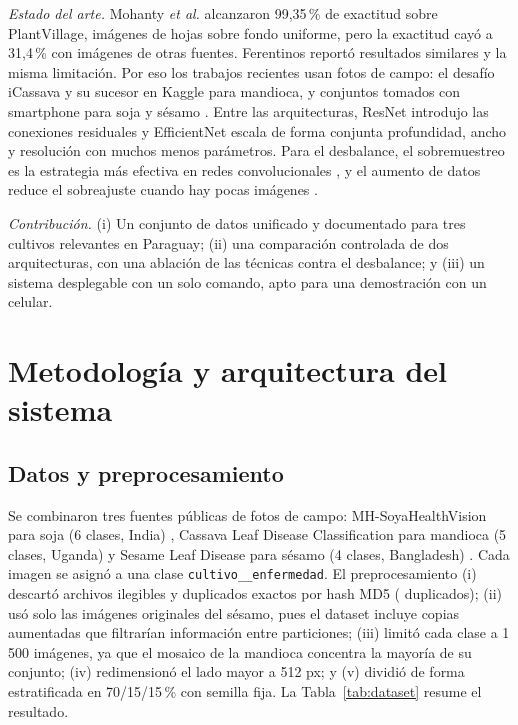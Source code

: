 \documentclass[conference]{IEEEtran}
\begin{document}
\textit{Estado del arte.} Mohanty \textit{et al.} \cite{mohanty2016} alcanzaron 99,35\,\% de exactitud sobre PlantVillage, im\'agenes de hojas sobre fondo uniforme, pero la exactitud cay\'o a 31,4\,\% con im\'agenes de otras fuentes. Ferentinos \cite{ferentinos2018} report\'o resultados similares y la misma limitaci\'on. Por eso los trabajos recientes usan fotos de campo: el desaf\'io iCassava \cite{mwebaze2019icassava} y su sucesor en Kaggle \cite{kaggle2020cassava} para mandioca, y conjuntos tomados con smartphone para soja \cite{shinde2024soya} y s\'esamo \cite{sesame2025dataset}. Entre las arquitecturas, ResNet \cite{he2016resnet} introdujo las conexiones residuales y EfficientNet \cite{tan2019efficientnet} escala de forma conjunta profundidad, ancho y resoluci\'on con muchos menos par\'ametros. Para el desbalance, el sobremuestreo es la estrategia m\'as efectiva en redes convolucionales \cite{buda2018imbalance}, y el aumento de datos reduce el sobreajuste cuando hay pocas im\'agenes \cite{shorten2019augmentation}.

\textit{Contribuci\'on.} (i) Un conjunto de datos unificado y documentado para tres cultivos relevantes en Paraguay; (ii) una comparaci\'on controlada de dos arquitecturas, con una ablaci\'on de las t\'ecnicas contra el desbalance; y (iii) un sistema desplegable con un solo comando, apto para una demostraci\'on con un celular.

\section{Metodolog\'ia y arquitectura del sistema}

\subsection{Datos y preprocesamiento}
Se combinaron tres fuentes p\'ublicas de fotos de campo: MH-SoyaHealthVision para soja (6 clases, India) \cite{shinde2024soya}, Cassava Leaf Disease Classification para mandioca (5 clases, Uganda) \cite{kaggle2020cassava} y Sesame Leaf Disease para s\'esamo (4 clases, Bangladesh) \cite{sesame2025dataset}. Cada imagen se asign\'o a una clase \texttt{cultivo\_\_enfermedad}. El preprocesamiento (i) descart\'o archivos ilegibles y duplicados exactos por hash MD5 (\dsDup{} duplicados); (ii) us\'o solo las im\'agenes originales del s\'esamo, pues el dataset incluye copias aumentadas que filtrar\'ian informaci\'on entre particiones; (iii) limit\'o cada clase a 1\,500 im\'agenes, ya que el mosaico de la mandioca concentra la mayor\'ia de su conjunto; (iv) redimension\'o el lado mayor a 512 px; y (v) dividi\'o de forma estratificada en 70/15/15\,\% con semilla fija. La Tabla~\ref{tab:dataset} resume el resultado.
\end{document}
